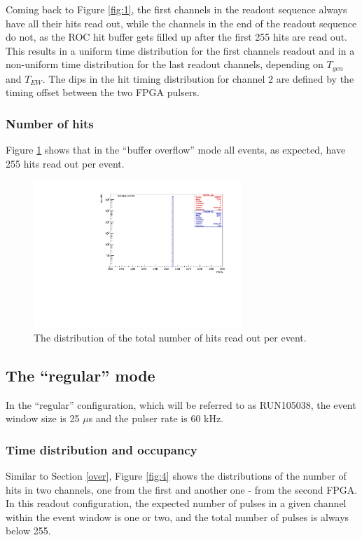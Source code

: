 Coming back to Figure \ref{fig:1}, the first channels in the readout sequence
always have all their hits read out,
while the channels in the end of the readout sequence do not,
as the ROC hit buffer gets filled up after
the first 255 hits are read out.
This results in a uniform time distribution for the first channels readout and in a non-uniform
time distribution for the last readout channels, depending on $T_{gen}$ and $T_{EW}$.
The dips in the hit timing distribution for channel 2 are defined by the timing offset
between the two FPGA pulsers. 


\subsubsection{Number of hits}
Figure \ref{fig:3} shows that in the ``buffer overflow'' mode all events,
as expected, have 255 hits read out per event.

\begin{figure}[!h]
\centering
\includegraphics[width =0.7\textwidth]{figures/pdf/figure_00008_nhits_281.pdf}
\caption{
  The distribution of the total number of hits read out per event.
}
\label{fig:3}
\end{figure}
\subsection{The ``regular'' mode }
In the ``regular'' configuration, which will be referred to as RUN105038, the event window size is 25 $\mu$s
and the pulser rate is 60 kHz.

\subsubsection{Time distribution and occupancy}

Similar to Section \ref{over}, Figure \ref{fig:4} shows the distributions
of the number of hits in two channels, one from the 
first and another one - from the second FPGA. 
In this readout configuration, the expected number of pulses in a given channel
within the event window is one or two, and the total number of pulses is always below 255.

